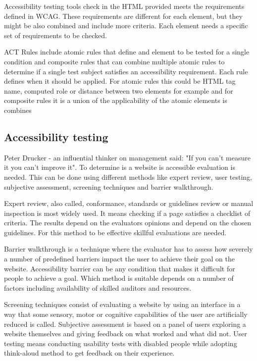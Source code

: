 \documentclass{master_thesis}
\begin{document}
Accessibility testing tools check in the HTML provided meets the requirements defined in WCAG. These requirements are different for each element, but they might be also combined and include more criteria. Each element needs a specific set of requirements to be checked.

ACT Rules include atomic rules that define and element to be tested for a single condition and composite rules that can combine multiple atomic rules to determine if a single test subject satisfies an accessibility requirement. Each rule defines when it should be applied. For atomic rules this could be HTML tag name, computed role or distance between two elements for example and for composite rules it is a union of the applicability of the atomic elements is combines  \citep{Fiers2019}

\subsection{Accessibility testing}

Peter Drucker - an influential thinker on management said: "If you can't measure it you can't improve it". To determine is a website is accessible evaluation is needed. This can be done using different methods like expert review, user testing, subjective assessment, screening techniques and barrier walkthrough.

Expert review, also called, conformance, standards or guidelines review or manual inspection is most widely used. It means checking if a page satisfies a checklist of criteria. The results depend on the evaluators opinions and depend on the chosen guidelines. For this method to be effective skillful evaluations are needed. \citep{Brajnik2008}

Barrier walkthrough is a technique where the evaluator has to assess how severely a number of predefined barriers impact the user to achieve their goal on the website. Accessibility barrier can be any condition that makes it difficult for people to achieve a goal. Which method is suitable depends on a number of factors including availability of skilled auditors and resources. \citep{Brajnik2008}

Screening techniques consist of evaluating a website by using an interface in a way that some sensory, motor or cognitive capabilities of the user are artificially reduced is called. Subjective assessment is based on a panel of users exploring a website themselves and giving feedback on what worked and what did not. User testing means conducting usability tests with disabled people while adopting think-aloud method to get feedback on their experience. \citep{Brajnik2008}
\end{document}
